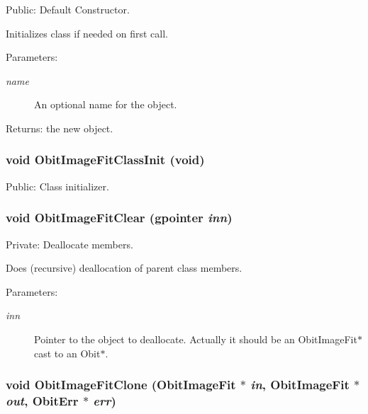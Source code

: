 Public: Default Constructor. 

Initializes class if needed on first call. \begin{Desc}
\item[Parameters:]
\begin{description}
\item[{\em name}]An optional name for the object. \end{description}
\end{Desc}
\begin{Desc}
\item[Returns:]the new object. \end{Desc}
\subsubsection{\setlength{\rightskip}{0pt plus 5cm}void Obit\-Image\-Fit\-Class\-Init (void)}\label{ObitImageFit_8c_a14}


Public: Class initializer. 

\subsubsection{\setlength{\rightskip}{0pt plus 5cm}void Obit\-Image\-Fit\-Clear (gpointer {\em inn})}\label{ObitImageFit_8c_a4}


Private: Deallocate members. 

Does (recursive) deallocation of parent class members. \begin{Desc}
\item[Parameters:]
\begin{description}
\item[{\em inn}]Pointer to the object to deallocate. Actually it should be an Obit\-Image\-Fit$\ast$ cast to an Obit$\ast$. \end{description}
\end{Desc}
\subsubsection{\setlength{\rightskip}{0pt plus 5cm}void Obit\-Image\-Fit\-Clone ({\bf Obit\-Image\-Fit} $\ast$ {\em in}, {\bf Obit\-Image\-Fit} $\ast$ {\em out}, {\bf Obit\-Err} $\ast$ {\em err})}\label{ObitImageFit_8c_a11}


